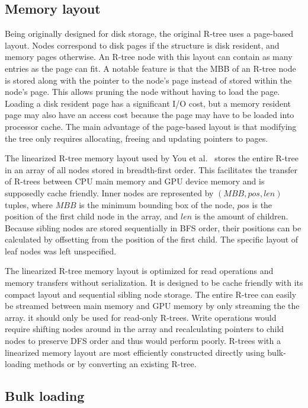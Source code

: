 \subsection{Memory layout}

Being originally designed for disk storage, the original R-tree uses a page-based layout. Nodes correspond to disk pages if the structure is disk resident, and memory pages otherwise. An R-tree node with this layout can contain as many entries as the page can fit. A notable feature is that the MBB of an R-tree node is stored along with the pointer to the node's page instead of stored within the node's page. This allows pruning the node without having to load the page. Loading a disk resident page has a significant I/O cost, but a memory resident page may also have an access cost because the page may have to be loaded into processor cache. The main advantage of the page-based layout is that modifying the tree only requires allocating, freeing and updating pointers to pages.

The linearized R-tree memory layout used by You et al.~\cite{you2013parallel} stores the entire R-tree in an array of all nodes stored in breadth-first order. This facilitates the transfer of R-trees between CPU main memory and GPU device memory and is supposedly cache friendly. Inner nodes are represented by \((MBB, pos, len)\) tuples, where \(MBB\) is the minimum bounding box of the node, \(pos\) is the position of the first child node in the array, and \(len\) is the amount of children. Because sibling nodes are stored sequentially in BFS order, their positions can be calculated by offsetting from the position of the first child. The specific layout of leaf nodes was left unspecified.

The linearized R-tree memory layout is optimized for read operations and memory transfers without serialization. It is designed to be cache friendly with its compact layout and sequential sibling node storage. The entire R-tree can easily be streamed between main memory and GPU memory by only streaming the the array. it should only be used for read-only R-trees. Write operations would require shifting nodes around in the array and recalculating pointers to child nodes to preserve DFS order and thus would perform poorly. R-trees with a linearized memory layout are most efficiently constructed directly using bulk-loading methods or by converting an existing R-tree.

\subsection{Bulk loading}

